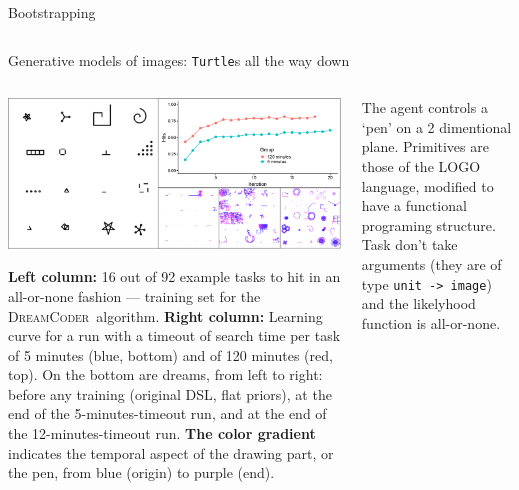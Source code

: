 \documentclass[final]{beamer}
\newlength{\onecolwid}
\newlength{\twocolwid}
\newlength{\threecolwid}
\newcommand{\system}{\textsc{DreamCoder}~}
\begin{document}
\begin{frame}[t]
\begin{columns}[t]
\begin{column}{\threecolwid}
\begin{columns}[t,totalwidth=\threecolwid]
\begin{column}{\threecolwid}
\begin{columns}[t,totalwidth=\threecolwid]
\begin{column}{\onecolwid}
\begin{block}{Bootstrapping}
  
\end{block}

\end{column}
\end{columns}

\begin{block}{Generative models of images: \texttt{Turtle}s all the way down}

\begin{columns}[t,totalwidth=\threecolwid] %

\begin{column}{\twocolwid} %
  
  \includegraphics[width=\twocolwid]{figures/dreams/montageLearningAndShapes.eps}

  \textbf{Left column:} 16 out of 92 example tasks to hit in an all-or-none
  fashion --- training set for the \system algorithm.
  \textbf{Right column:} Learning curve for a run with a timeout of search time
  per task of 5 minutes (blue, bottom) and of 120 minutes (red, top). On the
  bottom are dreams, from left to right: before any training (original DSL, flat
  priors), at the end of the 5-minutes-timeout run, and at the end of the
  12-minutes-timeout run. \textbf{The color gradient} indicates the temporal
  aspect of the drawing part, or the pen, from blue (origin) to purple (end).

\end{column}
\begin{column}{\onecolwid} %
  The agent controls a `pen' on a 2 dimentional plane. Primitives are those of
the LOGO language, modified to have a functional programing structure. Task
  don't take arguments (they are of type \texttt{unit -> image}) and the
  likelyhood function is all-or-none.


\end{column}
\end{columns}
\end{block}
\end{column}
\end{columns}
\end{column}
\end{columns}
\end{frame}
\end{document}
